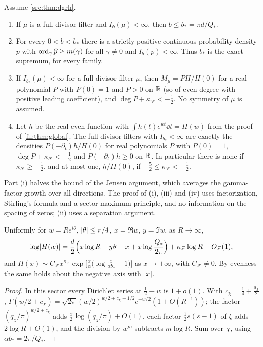 \begin{theorem}\label{fil:thm:endpoint}\label{fil:cor:endpoint}
Assume \cref{src:thm:dgrh}.
\begin{enumerate}[label=\textup{(\roman*)}]
\item If $\mu$ is a full-divisor filter and $I_b(\mu)<\infty$, then $b\le b_*=\pi d/Q_*$.
\item For every $0<b<b_*$ there is a strictly positive continuous probability density $p$ with
$\operatorname{ord}_\gamma\widehat p\ge m(\gamma)$ for all $\gamma\ne0$ and $I_b(p)<\infty$. Thus $b_*$ is the exact supremum, for
every family.
\item If $I_{b_*}(\mu)<\infty$ for a full-divisor filter $\mu$, then $M_\mu=PH/H(0)$ for a real polynomial $P$
with $P(0)=1$ and $P>0$ on $\mathbb{R}$ (so of even degree with positive leading coefficient), and
$\deg P+\kappa_{\mathcal F}<-\tfrac12$. No symmetry of $\mu$ is assumed.
\item Let $h$ be the real even function with $\int h(t)e^{wt}\dd t=H(w)$ from the proof of \cref{fil:thm:global}.
The full-divisor filters with $I_{b_*}<\infty$ are exactly the densities $P(-\partial_t)h/H(0)$ for real
polynomials $P$ with $P(0)=1$, $\deg P+\kappa_{\mathcal F}<-\tfrac12$ and $P(-\partial_t)h\ge0$ on $\mathbb{R}$. In
particular there is none if $\kappa_{\mathcal F}\ge-\tfrac12$, and at most one, $h/H(0)$, if
$-\tfrac52\le\kappa_{\mathcal F}<-\tfrac12$.
\end{enumerate}
\end{theorem}

Part (i) halves the bound of the Jensen argument, which averages the gamma-factor growth over all directions.
The proof of (i), (iii) and (iv) uses factorization, Stirling's formula and a sector maximum principle, and no
information on the spacing of zeros; (ii) uses a separation argument.

\begin{lemma}\label{fil:lem:sector}
Uniformly for $w=Re^{i\theta}$, $\lvert\theta\rvert\le\pi/4$, $x=\Re w$, $y=\Im w$, as $R\to\infty$,
\[
 \log\lvert H(w)\rvert=\frac d2\Bigl(x\log R-y\theta-x+x\log\frac{Q_*}{2\pi}\Bigr)+\kappa_{\mathcal F}\log R+O_{\mathcal F}(1),
\]
and $H(x)\sim C_{\mathcal F}x^{\kappa_{\mathcal F}}\exp\bigl[\frac x\alpha\bigl(\log\frac x{\alpha b_*}-1\bigr)\bigr]$ as $x\to+\infty$,
with $C_{\mathcal F}\ne0$. By evenness the same holds about the negative axis with $\lvert x\rvert$.
\end{lemma}

\begin{proof}
In this sector every Dirichlet series at $\tfrac12+w$ is $1+o(1)$. With $c_\chi=\tfrac14+\tfrac{a_\chi}2$,
$\Gamma(w/2+c_\chi)=\sqrt{2\pi}(w/2)^{w/2+c_\chi-1/2}e^{-w/2}(1+O(R^{-1}))$; the factor
$(q_\chi/\pi)^{w/2+c_\chi}$ adds $\tfrac x2\log(q_\chi/\pi)+O(1)$, each factor $\tfrac12s(s-1)$ of $\xi$ adds
$2\log R+O(1)$, and the division by $w^m$ subtracts $m\log R$. Sum over $\chi$, using $\alpha b_*=2\pi/Q_*$.
\end{proof}

